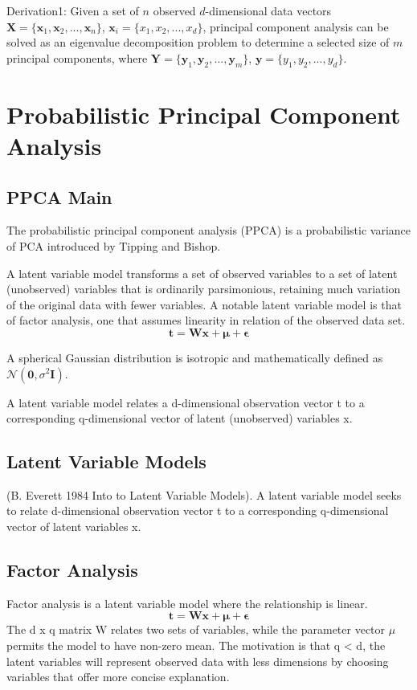 \documentclass[ %
                    author={Dillon Keith Diep},
                supervisor={Dr. Carl Henrik Ek},
                    degree={MEng},
                     title={Assisted Content Generation for 3D Hair Geometry},
                  subtitle={[INCOMPLETE DRAFT, CONTAINS NOTES FROM RESEARCH]},
                      type={Research},
                      year={2014} ]{dissertation}
\begin{document}
Derivation1:
Given a set of $n$ observed $d$-dimensional data vectors $\mathbf{X}=\{\mathbf{x}_1,\mathbf{x}_2,...,\mathbf{x}_n\}$, $\mathbf{x}_i = \{x_1,x_2,...,x_d\}$, principal component analysis can be solved as an eigenvalue decomposition problem to determine a selected size of $m$ principal components, where $\mathbf{Y}=\{\mathbf{y}_1,\mathbf{y}_2,...,\mathbf{y}_m\}$, $\mathbf{y}=\{y_1,y_2,...,y_d\}$. 

\section{Probabilistic Principal Component Analysis}

\subsection{PPCA Main}
The probabilistic principal component analysis (PPCA) is a probabilistic variance of PCA introduced by Tipping and Bishop\cite{PPCA}. 

A latent variable model transforms a set of observed variables to a set of latent (unobserved) variables that is ordinarily parsimonious, retaining much variation of the original data with fewer variables. A notable latent variable model is that of factor analysis, one that assumes linearity in relation of the observed data set.
\begin{equation} \label{factoranalysis}
	\mathbf{t=Wx+\mu+\epsilon}
\end{equation}





A spherical Gaussian distribution is isotropic and mathematically defined as $\mathcal{N}(\mathbf{0},\sigma^2\mathbf{I})$. 

A latent variable model relates a d-dimensional observation vector t to a corresponding q-dimensional vector of latent (unobserved) variables x.

\subsection{Latent Variable Models}
(B. Everett 1984 Into to Latent Variable Models).	
A latent variable model seeks to relate d-dimensional observation vector t to a corresponding q-dimensional vector of latent variables x.

\subsection{Factor Analysis}
Factor analysis is a latent variable model where the relationship is linear.
\begin{equation}
	\mathbf{t=Wx+\mu+\epsilon}
\end{equation}
The d x q matrix W relates two sets of variables, while the parameter vector $\mu$ permits the model to have non-zero mean. The motivation is that q < d, the latent variables will represent observed data with less dimensions by choosing variables that offer more concise explanation. 
\end{document}
